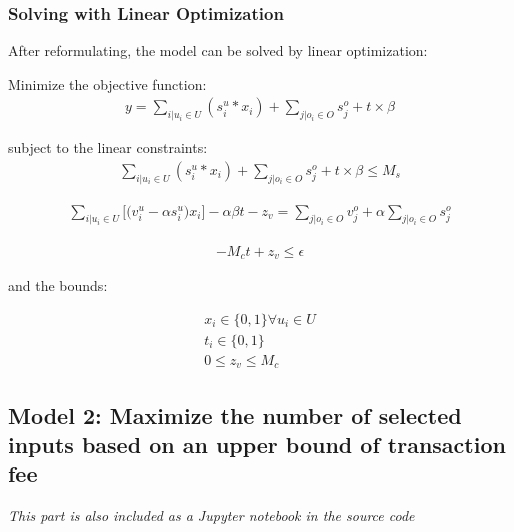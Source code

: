 \subsubsection{Solving with Linear Optimization}
\par After reformulating, the model can be solved by linear optimization:

Minimize the objective function:
\begin{align*}
  y = \sum\limits_{i|u_i \in U} (s_i^u * x_i) + \sum\limits_{j|o_i \in O} s_j^o + t \times \beta
\end{align*}

subject to the linear constraints:
\begin{align*}
  \sum\limits_{i|u_i \in U} (s_i^u * x_i) + \sum\limits_{j|o_i \in O} s_j^o + t \times \beta \leq M_s
\end{align*}

\begin{align*}
    \sum\limits_{i|u_i \in U} \bigg[\bigg(v_i^u - \alpha s_i^u\bigg) x_i \bigg] - \alpha \beta t - z_v
    =
    \sum\limits_{j|o_i \in O} v_j^o + \alpha \sum\limits_{j|o_i \in O} s_j^o
\end{align*}

\begin{align*}
-M_c t + z_v \leq \epsilon
\end{align*}

and the bounds:

\begin{align*}
    x_i \in \{0, 1\} \forall u_i \in U \\
    t_i \in \{0, 1\} \\
    0 \leq z_v \leq M_c
\end{align*}

  \subsection{Model 2: Maximize the number of selected inputs based on an upper bound of transaction fee}
    {
      \small
      \textit{This part is also included as a Jupyter notebook in the source code}
    }

